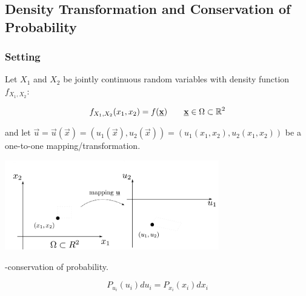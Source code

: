 \subsection{Density Transformation and Conservation of Probability}

\begin{frame}
\slidesonly{
\begin{center}
	\huge \subsecname
\end{center}
}
\end{frame}

\subsubsection{Setting}

\begin{frame}%

Let $X_1$ and $X_2$ be jointly continuous random variables with 
density function $f_{X_1, X_2}$:

\svspace{-3mm}

\begin{equation}
f_{X_1, X_2}(x_1, x_2) = f(\underline{\mathbf{x}}) \qquad \underline{\mathbf{x}} \in \Omega \subset \mathbb{R}^2
\end{equation}

\pause

and let $\vec u = \vec u(\vec x) = ( u_1(\vec x), u_2(\vec x)) = ( u_1(x_1, x_2), u_2(x_1, x_2)) $ be a one-to-one mapping/transformation.

\svspace{-3mm}

\begin{center}
\includegraphics[width=0.7\textwidth]{img/xu_mapping}
\end{center}

\svspace{-3mm}


\pause

-conservation of probability.

\svspace{-3mm}

\begin{equation}
P_{u_i}({u}_i) d {u}_i 
= P_{x_i} ({x}_i) d {x}_i
\end{equation}

\end{frame}

